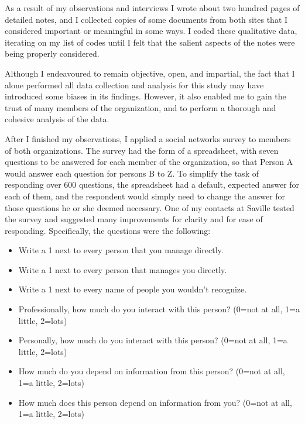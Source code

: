 As a result of my observations and interviews I wrote about two hundred pages of detailed notes, and I collected copies of some documents from both sites that I considered important or meaningful in some ways. I coded these qualitative data, iterating on my list of codes until I felt that the salient aspects of the notes were being properly considered.

Although I endeavoured to remain objective, open, and impartial, the fact that I alone performed all data collection and analysis for this study may have introduced some biases in its findings. However, it also enabled me to gain the trust of many members of the organization, and to perform a thorough and cohesive analysis of the data.

After I finished my observations, I applied a social networks survey to members of both organizations. The survey had the form of a spreadsheet, with seven questions to be answered for each member of the organization, so that Person A would answer each question for persons B to Z. To simplify the task of responding over 600 questions, the spreadsheet had a default, expected answer for each of them, and the respondent would simply need to change the answer for those questions he or she deemed necessary. One of my contacts at Saville tested the survey and suggested many improvements for clarity and for ease of responding. Specifically, the questions were the following:

\begin{itemize}
\item Write a 1 next to every person that you manage directly.

\item Write a 1 next to every person that manages you directly.

\item Write a 1 next to every name of people you wouldn't recognize.

\item Professionally, how much do you interact with this person? (0=not at all, 1=a little, 2=lots)

\item Personally, how much do you interact with this person? (0=not at all, 1=a little, 2=lots)

\item How much do you depend on information from this person? (0=not at all,      1=a little, 2=lots)

\item How much does this person depend on information from you? (0=not at all, 1=a little, 2=lots)

\end{itemize}

